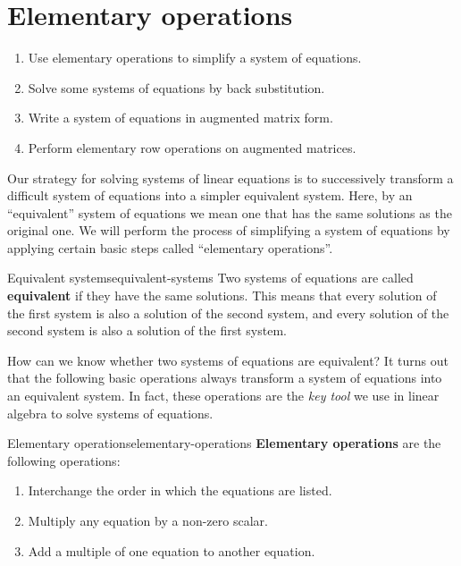 \section{Elementary operations}

\begin{outcome}
  \begin{enumerate}
  \item Use elementary operations to simplify a system of equations.
  \item Solve some systems of equations by back substitution.
  \item Write a system of equations in augmented matrix form.
  \item Perform elementary row operations on augmented matrices.
  \end{enumerate}
\end{outcome}

Our strategy for solving systems of linear equations is to
successively transform a difficult system of equations into a simpler
equivalent system. Here, by an ``equivalent'' system of equations we
mean one that has the same solutions as the original one. We will
perform the process of simplifying a system of equations by applying
certain basic steps called ``elementary operations''.

\begin{definition}{Equivalent systems}{equivalent-systems}
  Two systems of equations are called
  \textbf{equivalent}%
  if they have the same solutions. This means that every solution of
  the first system is also a solution of the second system, and every
  solution of the second system is also a solution of the first system.
\end{definition}

How can we know whether two systems of equations are equivalent? It
turns out that the following basic operations always transform a
system of equations into an equivalent system. In fact, these
operations are the {\em key tool} we use in linear algebra to solve
systems of equations.

\begin{definition}{Elementary operations}{elementary-operations}
  \textbf{Elementary operations}%
   are the
  following operations:

  \begin{enumerate}
  \item Interchange the order in which the equations are listed.

  \item Multiply any equation by a non-zero scalar.

  \item Add a multiple of one equation to another equation.
  \end{enumerate}
\end{definition}

